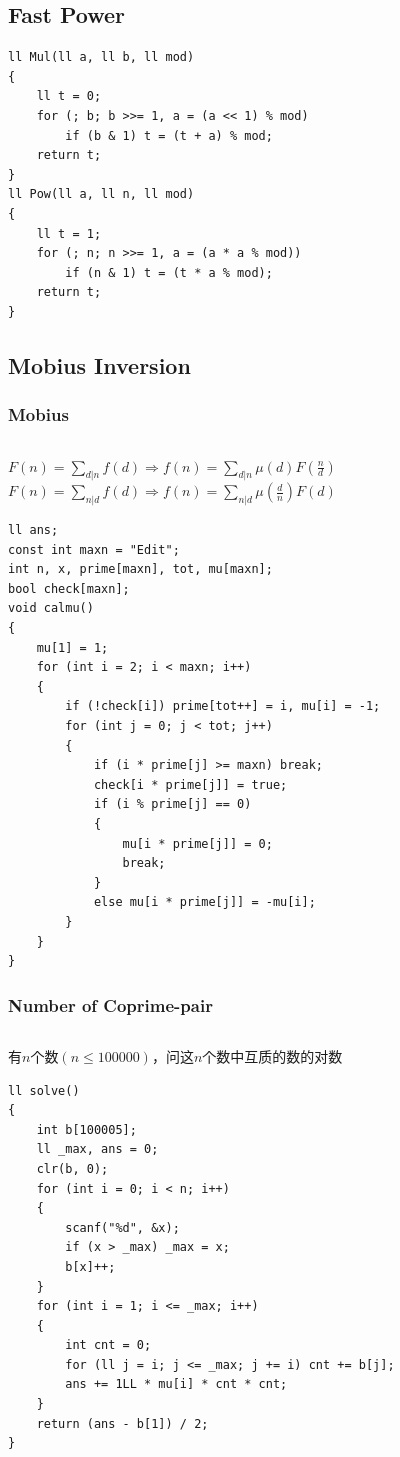 \documentclass[twoside]{article}
\begin{document}
\subsection{Fast Power}
\begin{lstlisting}
ll Mul(ll a, ll b, ll mod)
{
    ll t = 0;
    for (; b; b >>= 1, a = (a << 1) % mod)
        if (b & 1) t = (t + a) % mod;
    return t;
}
ll Pow(ll a, ll n, ll mod)
{
    ll t = 1;
    for (; n; n >>= 1, a = (a * a % mod))
        if (n & 1) t = (t * a % mod);
    return t;
}
\end{lstlisting}
\subsection{Mobius Inversion}
\subsubsection{Mobius}
\begin{lstlisting}
\end{lstlisting}
$F(n)=\sum_{d|n}f(d)\Rightarrow f(n)=\sum_{d|n}\mu(d)F(\frac{n}{d})$\\
$F(n)=\sum_{n|d}f(d)\Rightarrow f(n)=\sum_{n|d}\mu(\frac{d}{n})F(d)$
\begin{lstlisting}
ll ans;
const int maxn = "Edit";
int n, x, prime[maxn], tot, mu[maxn];
bool check[maxn];
void calmu()
{
    mu[1] = 1;
    for (int i = 2; i < maxn; i++)
    {
        if (!check[i]) prime[tot++] = i, mu[i] = -1;
        for (int j = 0; j < tot; j++)
        {
            if (i * prime[j] >= maxn) break;
            check[i * prime[j]] = true;
            if (i % prime[j] == 0)
            {
                mu[i * prime[j]] = 0;
                break;
            }
            else mu[i * prime[j]] = -mu[i];
        }
    }
}
\end{lstlisting}
\subsubsection{Number of Coprime-pair}
\begin{lstlisting}
\end{lstlisting}
有$n$个数$(n \leq 100000)$，问这$n$个数中互质的数的对数
\begin{lstlisting}
ll solve()
{
    int b[100005];
    ll _max, ans = 0;
    clr(b, 0);
    for (int i = 0; i < n; i++)
    {
        scanf("%d", &x);
        if (x > _max) _max = x;
        b[x]++;
    }
    for (int i = 1; i <= _max; i++)
    {
        int cnt = 0;
        for (ll j = i; j <= _max; j += i) cnt += b[j];
        ans += 1LL * mu[i] * cnt * cnt;
    }
    return (ans - b[1]) / 2;
}
\end{lstlisting}
\end{document}
